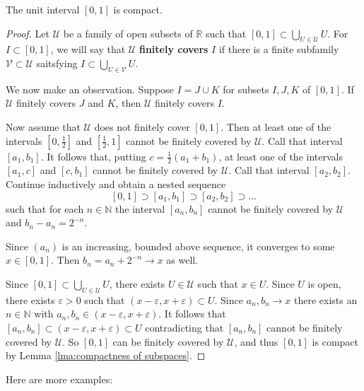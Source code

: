 \documentclass[a4paper,11pt]{article}
\begin{document}
\begin{theorem}\label{lma:[0,1] is compact}
    The unit interval $[0,1]$ is compact.
\end{theorem}
\begin{proof}
    Let $\mathcal{U}$ be a family of open subsets of $\mathbb{R}$ such that $[0,1] \subset \bigcup_{U \in \mathcal{U}} U$.
    For $I \subset[0,1]$, we will say that $\mathcal{U}$ \textbf{finitely covers} $I$ if there is a finite subfamily
    $\mathcal{V} \subset \mathcal{U}$ saitsfying $I \subset \bigcup_{U \in \mathcal{V}} U$.

    We now make an observation. Suppose $I=J \cup K$ for subsets $I, J, K$ of $[0,1]$.
    If $\mathcal{U}$ finitely covers $J$ and $K$, then $\mathcal{U}$ finitely covers $I$.

    Now assume that $\mathcal{U}$ does not finitely cover $[0,1]$. Then at least one of the intervals $\left[0, \frac{1}{2}\right]$ and $\left[\frac{1}{2}, 1\right]$ cannot be finitely covered by $\mathcal{U}$. Call that interval  $[a_{1}, b_{1}]$. It follows that, putting $c=\frac{1}{2}\left(a_{1}+b_{1}\right)$, at least one of the intervals $\left[a_{1}, c\right]$ and $\left[c, b_{1}\right]$ cannot be finitely covered by $\mathcal{U}$. Call that interval $\left[a_{2}, b_{2}\right]$. Continue inductively and obtain a nested sequence
    $$
    [0,1] \supset\left[a_{1}, b_{1}\right] \supset\left[a_{2}, b_{2}\right] \supset \ldots
    $$
    such that for each $n \in \mathbb{N}$ the interval $\left[a_{n}, b_{n}\right]$ cannot be finitely covered by $\mathcal{U}$ and $b_{n}-a_{n}=2^{-n}$.

    Since $\left(a_{n}\right)$ is an increasing, bounded above sequence, it converges to some $x \in[0,1]$. Then $b_{n}=a_{n}+2^{-n} \rightarrow x$ as well.

    Since $[0,1] \subset \bigcup_{U \in \mathcal{U}} U$, there exists $U \in \mathcal{U}$ such that $x \in U$. Since $U$ is open, there exists $\varepsilon>0$ such that $(x-\varepsilon, x+\varepsilon) \subset U$. Since $a_{n}, b_{n} \rightarrow x$ there exists an $n \in \mathbb{N}$ with $a_{n}, b_{n} \in(x-\varepsilon, x+\varepsilon)$. It follows that $\left[a_{n}, b_{n}\right] \subset(x-\varepsilon, x+\varepsilon) \subset U$ contradicting that $\left[a_{n}, b_{n}\right]$ cannot be finitely covered by $\mathcal{U}$. So $[0,1]$ can be finitely covered by $\mathcal{U}$, and thus $[0,1]$ is compact by Lemma \ref{lma:compactness of subspaces}.
\end{proof}
Here are more examples:
\end{document}
